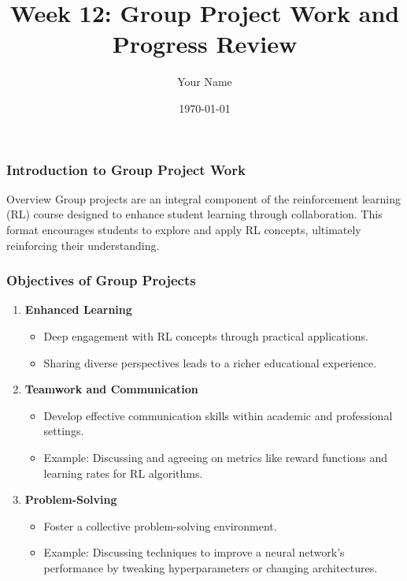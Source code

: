 \documentclass{beamer}
\title{Week 12: Group Project Work and Progress Review}
\author{Your Name}
\institute{Your Institution}
\date{\today}
\begin{document}
\frame{\titlepage}

\begin{frame}[fragile]
    \frametitle{Introduction to Group Project Work}
    \begin{block}{Overview}
        Group projects are an integral component of the reinforcement learning (RL) course designed to enhance student learning through collaboration. This format encourages students to explore and apply RL concepts, ultimately reinforcing their understanding.
    \end{block}
\end{frame}

\begin{frame}[fragile]
    \frametitle{Objectives of Group Projects}
    \begin{enumerate}
        \item \textbf{Enhanced Learning}
        \begin{itemize}
            \item Deep engagement with RL concepts through practical applications.
            \item Sharing diverse perspectives leads to a richer educational experience.
        \end{itemize}

        \item \textbf{Teamwork and Communication}
        \begin{itemize}
            \item Develop effective communication skills within academic and professional settings.
            \item Example: Discussing and agreeing on metrics like reward functions and learning rates for RL algorithms.
        \end{itemize}

        \item \textbf{Problem-Solving}
        \begin{itemize}
            \item Foster a collective problem-solving environment.
            \item Example: Discussing techniques to improve a neural network's performance by tweaking hyperparameters or changing architectures.
        \end{itemize}
    \end{enumerate}
\end{frame}
\end{document}
